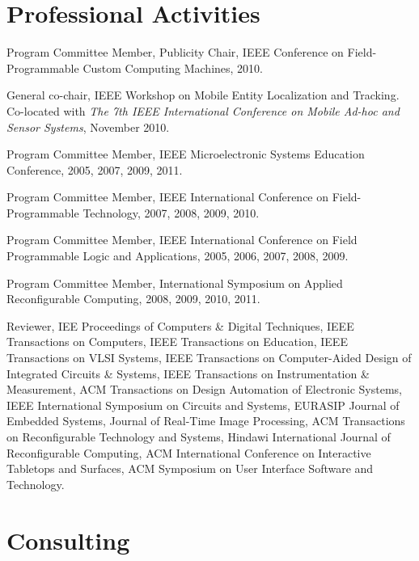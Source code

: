 \documentclass[line]{res}
\begin{document}
\begin{resume}
	\section{\sc Professional Activities}
	
	Program Committee Member, Publicity Chair, IEEE Conference on Field-Programmable Custom Computing Machines, 2010.
	
	General co-chair, IEEE Workshop on Mobile Entity Localization and Tracking. Co-located with \textit{The 7th IEEE International Conference on Mobile Ad-hoc and Sensor Systems}, November 2010.
	
	Program Committee Member, IEEE Microelectronic Systems Education Conference, 2005, 2007, 2009, 2011.
	
	Program Committee Member, IEEE International Conference on Field-Programmable Technology, 2007, 2008, 2009, 2010.
	
	Program Committee Member, IEEE International Conference on Field Programmable Logic and Applications, 2005, 2006, 2007, 2008, 2009.
	
	Program Committee Member, International Symposium on Applied Reconfigurable Computing, 2008, 2009, 2010, 2011.
	
	Reviewer, IEE Proceedings of Computers \& Digital Techniques, IEEE Transactions on Computers, IEEE Transactions on Education, IEEE Transactions on VLSI Systems, IEEE Transactions on Computer-Aided Design of Integrated Circuits \& Systems, IEEE Transactions on Instrumentation \& Measurement, ACM Transactions on Design Automation of Electronic Systems, IEEE International Symposium on Circuits and Systems, EURASIP Journal of Embedded Systems, Journal of Real-Time Image Processing, ACM Transactions on Reconfigurable Technology and Systems, Hindawi International Journal of Reconfigurable Computing, ACM International Conference on Interactive Tabletops and Surfaces, ACM Symposium on User Interface Software and Technology.
	
	\section{\sc Consulting}
	\begin{format}
		\\
		\body\\
	\end{format}


\end{resume}
\end{document}
